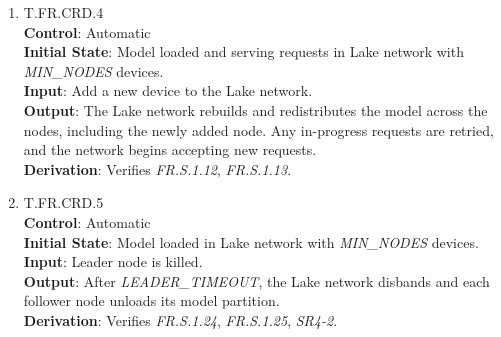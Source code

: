 \documentclass[12pt, titlepage]{article}
\begin{document}
\begin{enumerate}
		\textit{FR.S.1.13}, \textit{FR.S.1.22}, \textit{FR.S.1.23}, \textit{FR.S.1.2},
		\textit{FR.S.1.3}, \textit{FR.S.3.4}, \textit{FR.S.4.5}.
	\item{T.FR.CRD.4}\label{T.FR.CRD.4} \\
		\textbf{Control}: Automatic \\
		\textbf{Initial State}: Model loaded and serving requests in Lake network with \textit{MIN\_NODES}
		devices. \\
		\textbf{Input}: Add a new device to the Lake network. \\
		\textbf{Output}: The Lake network rebuilds and redistributes the model across the nodes,
		including the newly added node. Any in-progress requests are retried, and the network begins
		accepting new requests.\\
		\textbf{Derivation}: Verifies \textit{FR.S.1.12}, \textit{FR.S.1.13}.
	\item{T.FR.CRD.5}\label{T.FR.CRD.5} \\
		\textbf{Control}: Automatic \\
		\textbf{Initial State}: Model loaded in Lake network with \textit{MIN\_NODES} devices. \\
		\textbf{Input}: Leader node is killed. \\
		\textbf{Output}: After \textit{LEADER\_TIMEOUT}, the Lake network disbands and each
		follower node unloads its model partition. \\
		\textbf{Derivation}: Verifies \textit{FR.S.1.24}, \textit{FR.S.1.25}, \textit{SR4-2}.
\end{enumerate}
\end{document}
